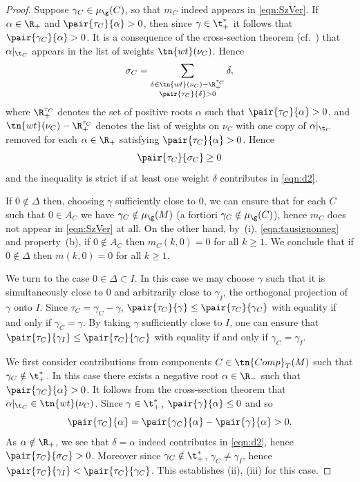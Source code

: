 \begin{proof}
Suppose $\gamma_C \in \mu_\g(C)$, so that $m_C$ indeed appears in \eqref{eqn:SzVer}. If $\alpha \in \R_+$ and $\pair{\tau_C}{\alpha}>0$, then since $\gamma \in \t^\ast_+$ it follows that $\pair{\gamma_C}{\alpha}>0$. It is a consequence of the cross-section theorem (cf.~\cite{ConvexitySympCuts}) that $\alpha|_{\t_C}$ appears in the list of weights $\tn{wt}(\nu_C)$. Hence
\begin{gather}\label{eqn:d2}
\sigma_C=\sum_{\substack{\delta \in \tn{wt}(\nu_C)-\R_+^{\tau_C}\\ \pair{\tau_C}{\delta}>0}} \delta,
\end{gather}
where $\R_+^{\tau_C}$ denotes the set of positive roots $\alpha$ such that $\pair{\tau_C}{\alpha}>0$, and $\tn{wt}(\nu_C)-\R_+^{\tau_C}$ denotes the list of weights on $\nu_C$ with one copy of $\alpha|_{\t_C}$ removed for each $\alpha \in \R_+$ satisfying $\pair{\tau_C}{\alpha}>0$. Hence{\samepage
\begin{gather}\label{eqn:tausignonneg}
\pair{\tau_C}{\sigma_C}\ge 0
\end{gather}
and the inequality is strict if at least one weight $\delta$ contributes in \eqref{eqn:d2}.}

If $0 \notin \Delta$ then, choosing $\gamma$ sufficiently close to $0$, we can ensure that for each $C$ such that $0 \in A_C$ we have $\gamma_C \notin \mu_\g(M)$ (a fortiori $\gamma_C \notin \mu_\g(C)$), hence $m_C$ does not appear in \eqref{eqn:SzVer} at all. On the other hand, by~(i), \eqref{eqn:tausignonneg} and property~(b), if $0 \notin A_C$ then $m_C(k,0)=0$ for all $k \ge 1$. We conclude that if $0 \notin \Delta$ then $m(k,0)=0$ for all $k \ge 1$.

We turn to the case $0 \in \Delta \subset I$. In this case we may choose $\gamma$ such that it is simultaneously close to $0$ and arbitrarily close to $\gamma_I$, the orthogonal projection of $\gamma$ onto $I$. Since $\tau_C=\gamma_C-\gamma$, $\pair{\tau_C}{\gamma}\le \pair{\tau_C}{\gamma_C}$ with equality if and only if $\gamma_C=\gamma$. By taking $\gamma$ sufficiently close to $I$, one can ensure that $\pair{\tau_C}{\gamma_I}\le \pair{\tau_C}{\gamma_C}$ with equality if and only if $\gamma_C=\gamma_I$.

We first consider contributions from components $C \in \tn{Comp}_T(M)$ such that $\gamma_C \notin \t_+^\ast$. In this case there exists a negative root $\alpha \in \R_-$ such that $\pair{\gamma_C}{\alpha}>0$. It follows from the cross-section theorem that $\alpha|_{\t_C} \in \tn{wt}(\nu_C)$. Since $\gamma \in \t_+^\ast$, $\pair{\gamma}{\alpha}\le 0$ and so
\[ \pair{\tau_C}{\alpha}=\pair{\gamma_C}{\alpha}-\pair{\gamma}{\alpha}>0. \]
As $\alpha \notin \R_+$, we see that $\delta=\alpha$ indeed contributes in \eqref{eqn:d2}, hence $\pair{\tau_C}{\sigma_C}>0$. Moreover since $\gamma_C \notin \t_+^\ast$, $\gamma_C \ne \gamma_I$, hence $\pair{\tau_C}{\gamma_I}<\pair{\tau_C}{\gamma_C}$. This establishes (ii), (iii) for this case.


\end{proof}
